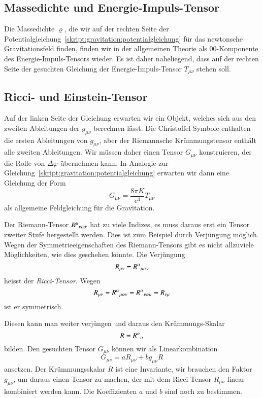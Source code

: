 \subsection{Massedichte und Energie-Impuls-Tensor}
Die Massedichte $\varrho$, die wir auf der rechten Seite der
Potentialgleichung~\eqref{skript:gravitation:potentialgleichung}
für das newtonsche Gravitationsfeld finden,
finden wir in der allgemeinen Theorie als $00$-Komponente
des Energie-Impuls-Tensors wieder.
Es ist daher naheliegend, dass auf der rechten Seite der gesuchten
Gleichung der Energie-Impuls-Tensor $T_{\mu\nu}$ stehen soll.

\subsection{Ricci- und Einstein-Tensor}
Auf der linken Seite der Gleichung erwarten wir ein Objekt, welches
sich aus den zweiten Ableitungen der $g_{\mu\nu}$ berechnen lässt.
Die Christoffel-Symbole enthalten die ersten Ableitungen von $g_{\mu\nu}$,
aber der Riemannsche Krümmungstensor enthält alle zweiten Ableitungen.
Wir müssen daher einen Tensor $G_{\mu\nu}$ konstruieren, der die Rolle
von $\Delta\varphi$ übernehmen kann.
In Analogie zur
Gleichung~\eqref{skript:gravitation:potentialgleichung}
erwarten wir dann eine Gleichung der Form
\[
G_{\mu\nu} = \frac{8\pi K}{c^4}T_{\mu\nu}
\]
als allgemeine Feldgleichung für die Gravitation.

Der Riemann-Tensor $R^\mu\mathstrut_{\nu\varrho\sigma}$ hat zu viele
Indizes, es muss daraus erst ein Tensor zweiter Stufe hergestellt werden.
Dies ist zum Beispiel durch Verjüngung möglich.
Wegen der Symmetrieeigenschaften des Riemann-Tensors gibt es nicht allzuviele
Möglichkeiten, wie dies geschehen könnte.
Die Verjüngung 
\[
R_{\mu\nu} = R^{\alpha}\mathstrut_{\mu\alpha\nu}
\]
heisst der {\em Ricci-Tensor}.
Wegen
\[
R_{\mu\nu}
=
R^{\alpha}\mathstrut_{\mu\alpha\nu}
=
R^{\alpha}\mathstrut_{\nu\alpha\mu}
=
R_{\nu\mu}
\]
ist er symmetrisch.


Diesen kann man weiter verjüngen und daraus den Krümmungs-Skalar
\[
R=R^\alpha\mathstrut_\alpha
\]
bilden.
Den gesuchten Tensor $G_{\mu\nu}$ können wir als Linearkombination
\begin{equation}
G_{\mu\nu}=a R_{\mu\nu} + bg_{\mu\nu} R
\label{skript:gravitation:einsteinansatz}
\end{equation}
ansetzen.
Der Krümmungsskalar $R$ ist eine Invariante, wir brauchen den Faktor
$g_{\mu\nu}$, um daraus einen Tensor zu machen, der mit dem Ricci-Tensor
$R_{\mu\nu}$ linear kombiniert werden kann.
Die Koeffizienten $a$ und $b$ sind noch zu bestimmen.

